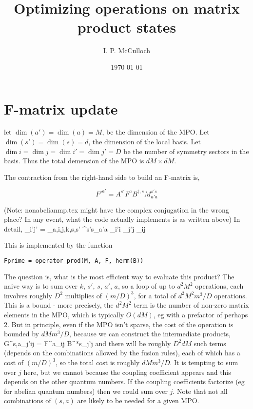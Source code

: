 \documentclass{article}[10pt]
\begin{document}
\title{Optimizing operations on matrix product states}

\author{I. P. McCulloch}
\date{\today}

\maketitle

\section{F-matrix update}

let $\dim(a') = \dim(a) = M$, be the dimension of the MPO. Let $\dim(s') = \dim(s) = d$, the dimension
of the local basis. Let $\dim{i} = \dim{j} = \dim{i'} = \dim{j'} = D$ be the number of symmetry sectors
in the basis. Thus the total demension of the MPO is $dM \times dM$.

The contraction from the right-hand side to build an F-matrix is,

\begin{equation}
F'^{a'} = A^{s'} F^a B^{\dagger,s} M^{s's}_{a'a}
\end{equation}

(Note: nonabelianmp.tex might have the complex conjugation in the wrong place? In any event,
what the code actually implements is as written above) In detail, 
\beq
{}_{i'j'} =
\sum_{a,i,j,k,s,s'}
^{s's}_{a'a} _{i'i} _{j'j} 
_{ij}
\eeq

This is implemented by the function 
\begin{verbatim}Fprime = operator_prod(M, A, F, herm(B))\end{verbatim}

The question is, what is the most efficient way to evaluate this product? The naive way is to sum over
$k$, $s'$, $s$, $a'$, $a$, so a loop of up to $d^2 M^2$ operations, each involves roughly $D^2$ multiplies
of $(m/D)^3$, for a total of $d^2 M^2 m^3 / D$ operations. This is a bound - more precisely, the
$d^2 M^2$ term is the number of non-zero matrix elements in the MPO, which is typically $O(dM)$, eg with 
a prefactor of perhaps 2. But in principle, even if the MPO isn't sparse, the cost of the operation is bounded
by $d M m^3 / D$, because we can construct the intermediate products,
\beq
G^{s,a}_{j'ij} = F^a_{ij} B^{*s}_{j'j}
\eeq
and there will be roughly $D^2 dM$ such terms (depends on the combinations allowed by the fusion rules), 
each of which has a cost of
$(m/D)^3$, so the total cost is roughly $dM m^3/D$.
It is tempting to sum over $j$ here, but we cannot because the coupling coefficient appears and
this depends on the other quantum numbers. If the coupling coefficients factorize (eg for abelian quantum numbers)
then we could sum over $j$. Note that not all combinations of $(s,a)$ are likely to be needed for a given MPO.
\end{document}
